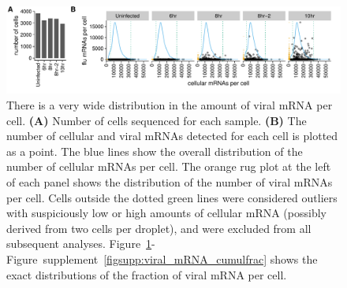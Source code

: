 \documentclass[9pt,lineno]{elife}
\begin{document}
\begin{figure}
\centerline{\includegraphics[width=\linewidth]{figures/p_cell_mRNA_summary.pdf}}
\caption{\label{fig:cells}
There is a very wide distribution in the amount of viral mRNA per cell.
{\bf (A)} 
Number of cells sequenced for each sample.
{\bf (B)} 
The number of cellular and viral mRNAs detected for each cell is plotted as a point.
The blue lines show the overall distribution of the number of cellular mRNAs per cell.
The orange rug plot at the left of each panel shows the distribution of the number of viral mRNAs per cell.
Cells outside the dotted green lines were considered outliers with suspiciously low or high amounts of cellular mRNA (possibly derived from two cells per droplet), and were excluded from all subsequent analyses.
Figure~\ref{fig:cells}-Figure~supplement~\ref{figsupp:viral_mRNA_cumulfrac} shows the exact distributions of the fraction of viral mRNA per cell.
}
\end{figure}
\end{document}
